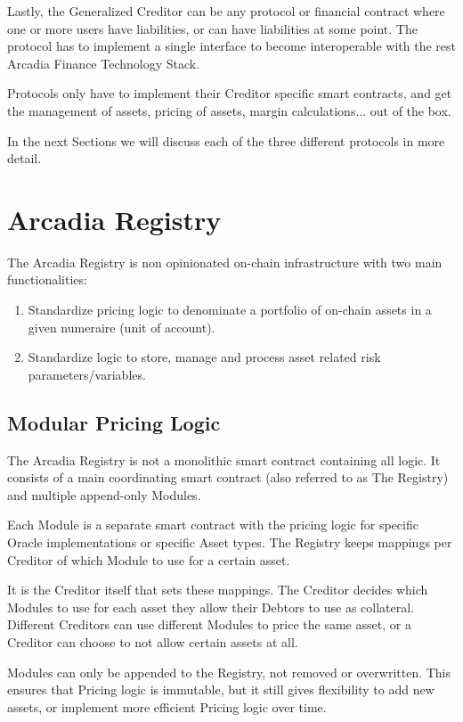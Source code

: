 \documentclass[sigconf,nonacm]{acmart}
\begin{document}
Lastly, the Generalized Creditor can be any protocol or financial contract where one or more users have liabilities, or can have liabilities at some point.
The protocol has to implement a single interface to become interoperable with the rest Arcadia Finance Technology Stack.

Protocols only have to implement their Creditor specific smart contracts,
and get the management of assets, pricing of assets, margin calculations... out of the box.

In the next Sections we will discuss each of the three different protocols in more detail.

\section{Arcadia Registry}
\label{sec:arcadia-registry}

The Arcadia Registry is non opinionated on-chain infrastructure with two main functionalities:
\begin{enumerate}
    \item Standardize pricing logic to denominate a portfolio of on-chain assets in a given numeraire (unit of account).
    \item Standardize logic to store, manage and process asset related risk parameters/variables.
\end{enumerate}

\subsection{Modular Pricing Logic}
\label{subsec:modular-pricing-logic}
The Arcadia Registry is not a monolithic smart contract containing all logic.
It consists of a main coordinating smart contract (also referred to as The Registry) and multiple append-only Modules.

Each Module is a separate smart contract with the pricing logic for specific Oracle implementations or specific Asset types.
The Registry keeps mappings per Creditor of which Module to use for a certain asset.

It is the Creditor itself that sets these mappings. The Creditor decides which Modules to use for each asset they allow their Debtors to use as collateral.
Different Creditors can use different Modules to price the same asset, or a Creditor can choose to not allow certain assets at all.

Modules can only be appended to the Registry, not removed or overwritten.
This ensures that Pricing logic is immutable, but it still gives flexibility to add new assets, or implement more efficient Pricing logic over time.
\end{document}
